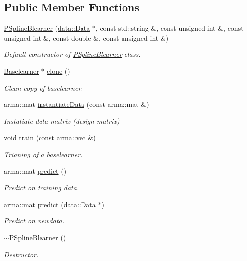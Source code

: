 \subsection*{Public Member Functions}
\begin{DoxyCompactItemize}
\item 
\hyperlink{classblearner_1_1_p_spline_blearner_aceffa2bd25f0d8ff728cb7c6eb084809}{P\+Spline\+Blearner} (\hyperlink{classdata_1_1_data}{data\+::\+Data} $\ast$, const std\+::string \&, const unsigned int \&, const unsigned int \&, const double \&, const unsigned int \&)
\begin{DoxyCompactList}\small\item\em Default constructor of {\ttfamily \hyperlink{classblearner_1_1_p_spline_blearner}{P\+Spline\+Blearner}} class. \end{DoxyCompactList}\item 
\hyperlink{classblearner_1_1_baselearner}{Baselearner} $\ast$ \hyperlink{classblearner_1_1_p_spline_blearner_a6fca532d2d20dfa284acc474ee1d7531}{clone} ()
\begin{DoxyCompactList}\small\item\em Clean copy of baselearner. \end{DoxyCompactList}\item 
arma\+::mat \hyperlink{classblearner_1_1_p_spline_blearner_ac0604daac451678e67a6a2ac60dd1b01}{instantiate\+Data} (const arma\+::mat \&)
\begin{DoxyCompactList}\small\item\em Instatiate data matrix (design matrix) \end{DoxyCompactList}\item 
void \hyperlink{classblearner_1_1_p_spline_blearner_aa5c18ceb8396ffce556588486d574be8}{train} (const arma\+::vec \&)
\begin{DoxyCompactList}\small\item\em Trianing of a baselearner. \end{DoxyCompactList}\item 
arma\+::mat \hyperlink{classblearner_1_1_p_spline_blearner_aa46e4474a352876fbfad64921254f6d5}{predict} ()
\begin{DoxyCompactList}\small\item\em Predict on training data. \end{DoxyCompactList}\item 
arma\+::mat \hyperlink{classblearner_1_1_p_spline_blearner_a9d35aeb36c403c167fb7519379825873}{predict} (\hyperlink{classdata_1_1_data}{data\+::\+Data} $\ast$)
\begin{DoxyCompactList}\small\item\em Predict on newdata. \end{DoxyCompactList}\item 
\hyperlink{classblearner_1_1_p_spline_blearner_ac2d4d8cb7462735d944b6aa69896374d}{$\sim$\+P\+Spline\+Blearner} ()
\begin{DoxyCompactList}\small\item\em Destructor. \end{DoxyCompactList}\end{DoxyCompactItemize}
